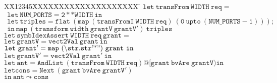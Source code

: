 \documentclass{article}
\newlength{\fminilength}
\newenvironment{fmini}[1][\linewidth]
  {\setlength{\fminilength}{#1\fboxsep-2\fboxrule}%
   \vspace{2ex}\noindent\begin{lrbox}{\fminibox}\begin{minipage}{\fminilength}%
   \mbox{ }\hfill\vspace{-2.5ex}}%
  {\end{minipage}\end{lrbox}\vspace{1ex}\hspace{0ex}%
   \framebox{\usebox{\fminibox}}}
\newenvironment{specification}
{\noindent\footnotesize\tt\begin{fmini}\begin{tabbing}X\=X12345\=XXXX\=XXXX\=XXXX\=XXXX\=XXXX
\=\+\kill} {\end{tabbing}\normalfont\end{fmini}}
\begin{document}
\begin{specification}
$\mathtt{let\ transFrom\ WIDTH\ req=}$\\

$\mathtt{\ \ let\ NUM\_PORTS=2**WIDTH\ in}$\\

$\mathtt{\ \ let\ triples= flat\ (map\ (transFromI\ WIDTH\ req)\ (0\ upto\ (NUM\_PORTS-1)));}$\\

$\mathtt{\ \ in\ map\ (transform\  width\ grantV\ grantV')\ triples}$\\


$\mathtt{let\ symbIdexAssert\ WIDTH\ req\ grant=}$\\
 $\mathtt{  let\ grantV=vect2Val\ grant\ in}$\\

  $\mathtt{let\ grant'=map\ (\backslash str.str"'")\ grant\ in}$\\
  $\mathtt{let\ grantV'=vect2Val\ grant'\ in}$\\
  $\mathtt{let\ ant=AndList\ (transFrom\ WIDTH\ req)@[grant\ bvAre\
  grantV)
  in}$\\
  $\mathtt{let cons=Next\ (grant\ bvAre\ grantV')}$\\
  $\mathtt{in\ ant\leadsto cons}$
\end{specification}
\end{document}
